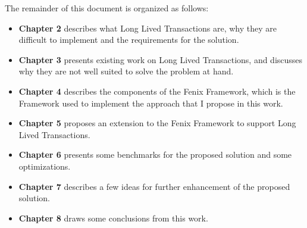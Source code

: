 The remainder of this document is organized as follows:

\begin{itemize}

\item {\bf Chapter 2} describes what Long Lived Transactions are, why
  they are difficult to implement and the requirements for the solution.

\item {\bf Chapter 3} presents existing work on Long Lived
  Transactions, and discusses why they are not well suited to solve
  the problem at hand.

\item {\bf Chapter 4} describes the components of the Fenix Framework,
  which is the Framework used to implement the approach that I propose
  in this work.

\item {\bf Chapter 5} proposes an extension to the Fenix Framework to
  support Long Lived Transactions.

\item {\bf Chapter 6} presents some benchmarks for the proposed
  solution and some optimizations.

\item {\bf Chapter 7} describes a few ideas for further enhancement of
  the proposed solution.

\item {\bf Chapter 8} draws some conclusions from this work.

\end{itemize}